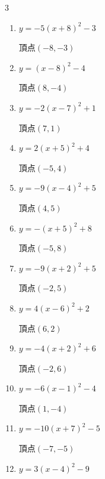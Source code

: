 \begin{multicols}{3}
\begin{enumerate}
        $\displaystyle 頂点\left( 5 , 5 \right)$

  \item $\displaystyle y=-5\left( x+8\right)^{2}-3$

        $\displaystyle 頂点\left( -8 , -3 \right)$

  \item $\displaystyle y=\left( x-8\right)^{2}-4$

        $\displaystyle 頂点\left( 8 , -4 \right)$

  \item $\displaystyle y=-2\left( x-7\right)^{2}+1$

        $\displaystyle 頂点\left( 7 , 1 \right)$

  \item $\displaystyle y=2\left( x+5\right)^{2}+4$

        $\displaystyle 頂点\left( -5 , 4 \right)$

  \item $\displaystyle y=-9\left( x-4\right)^{2}+5$

        $\displaystyle 頂点\left( 4 , 5 \right)$

  \item $\displaystyle y=-\left( x+5\right)^{2}+8$

        $\displaystyle 頂点\left( -5 , 8 \right)$

  \item $\displaystyle y=-9\left( x+2\right)^{2}+5$

        $\displaystyle 頂点\left( -2 , 5 \right)$

  \item $\displaystyle y=4\left( x-6\right)^{2}+2$

        $\displaystyle 頂点\left( 6 , 2 \right)$

  \item $\displaystyle y=-4\left( x+2\right)^{2}+6$

        $\displaystyle 頂点\left( -2 , 6 \right)$

  \item $\displaystyle y=-6\left( x-1\right)^{2}-4$

        $\displaystyle 頂点\left( 1 , -4 \right)$

  \item $\displaystyle y=-10\left( x+7\right)^{2}-5$

        $\displaystyle 頂点\left( -7 , -5 \right)$

  \item $\displaystyle y=3\left( x-4\right)^{2}-9$


\end{enumerate}
\end{multicols}
